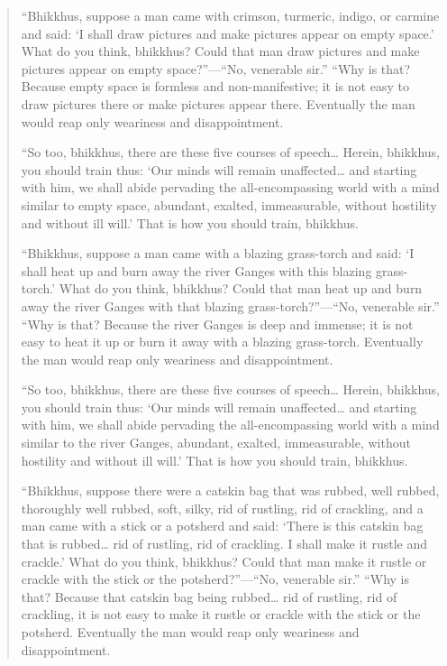 \begin{quotation}
“Bhikkhus, suppose a man came with crimson, turmeric, indigo, or carmine
and said: ‘I shall draw pictures and make pictures appear on empty
space.’ What do you think, bhikkhus? Could that man draw pictures and
make pictures appear on empty space?”—“No, venerable sir.” “Why is that?
Because empty space is formless and non-manifestive; it is not easy to
draw pictures there or make pictures appear there. Eventually the man
would reap only weariness and disappointment.

“So too, bhikkhus, there are these five courses of speech\ldots{} Herein,
bhikkhus, you should train thus: ‘Our minds will remain unaffected\ldots{}
and starting with him, we shall abide pervading the all-encompassing
world with a mind similar to empty space, abundant, exalted,
immeasurable, without hostility and without ill will.’ That is how you
should train, bhikkhus.

“Bhikkhus, suppose a man came with a blazing grass-torch and said: ‘I
shall heat up and burn away the river Ganges with this blazing
grass-torch.’ What do you think, bhikkhus? Could that man heat up and
burn away the river Ganges with that blazing grass-torch?”—“No,
venerable sir.” “Why is that? Because the river Ganges is deep and
immense; it is not easy to heat it up or burn it away with a blazing
grass-torch. Eventually the man would reap only weariness and
disappointment.

“So too, bhikkhus, there are these five courses of speech\ldots{} Herein,
bhikkhus, you should train thus: ‘Our minds will remain unaffected\ldots{}
and starting with him, we shall abide pervading the all-encompassing
world with a mind similar to the river Ganges, abundant, exalted,
immeasurable, without hostility and without ill will.’ That is how you
should train, bhikkhus.

“Bhikkhus, suppose there were a catskin bag that was rubbed, well
rubbed, thoroughly well rubbed, soft, silky, rid of rustling, rid of
crackling, and a man came with a stick or a potsherd and said: ‘There is
this catskin bag that is rubbed\ldots{} rid of rustling, rid of crackling. I
shall make it rustle and crackle.’ What do you think, bhikkhus? Could
that man make it rustle or crackle with the stick or the potsherd?”—“No,
venerable sir.” “Why is that? Because that catskin bag being rubbed\ldots{}
rid of rustling, rid of crackling, it is not easy to make it rustle or
crackle with the stick or the potsherd. Eventually the man would reap
only weariness and disappointment.


\end{quotation}
